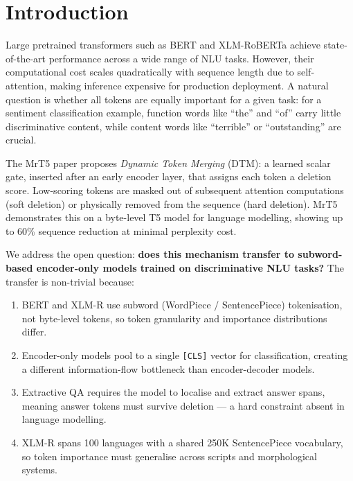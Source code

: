 \documentclass[11pt,a4paper]{article}
\begin{document}
\section{Introduction}
\label{sec:introduction}

Large pretrained transformers such as BERT \citep{devlin2019bert} and XLM-RoBERTa \citep{conneau2020xlmr} achieve state-of-the-art performance across a wide range of NLU tasks. However, their computational cost scales quadratically with sequence length due to self-attention, making inference expensive for production deployment. A natural question is whether all tokens are equally important for a given task: for a sentiment classification example, function words like ``the'' and ``of'' carry little discriminative content, while content words like ``terrible'' or ``outstanding'' are crucial.

The MrT5 paper \citep{kallini2024mrt5} proposes \emph{Dynamic Token Merging} (DTM): a learned scalar gate, inserted after an early encoder layer, that assigns each token a deletion score. Low-scoring tokens are masked out of subsequent attention computations (soft deletion) or physically removed from the sequence (hard deletion). MrT5 demonstrates this on a byte-level T5 model for language modelling, showing up to 60\% sequence reduction at minimal perplexity cost.

We address the open question: \textbf{does this mechanism transfer to subword-based encoder-only models trained on discriminative NLU tasks?} The transfer is non-trivial because:

\begin{enumerate}[nosep]
    \item BERT and XLM-R use subword (WordPiece / SentencePiece) tokenisation, not byte-level tokens, so token granularity and importance distributions differ.
    \item Encoder-only models pool to a single \texttt{[CLS]} vector for classification, creating a different information-flow bottleneck than encoder-decoder models.
    \item Extractive QA requires the model to localise and extract answer spans, meaning answer tokens must survive deletion --- a hard constraint absent in language modelling.
    \item XLM-R spans 100 languages with a shared 250K SentencePiece vocabulary, so token importance must generalise across scripts and morphological systems.
\end{enumerate}
\end{document}
